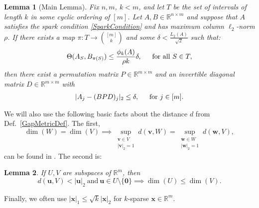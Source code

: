 \documentclass[journal, twocolumn]{IEEEtran}
\newtheorem{lemma}{Lemma}
\begin{document}
\begin{lemma}[Main Lemma]\label{MainLemma}
Fix $n, m$, $k < m$, and let $T$ be the set of intervals of length $k$ in some cyclic ordering of $[m]$. Let $A, B \in \mathbb{R}^{n \times m}$ and suppose that $A$ satisfies the spark condition \eqref{SparkCondition} and has maximum column $\ell_2$-norm $\rho$.  If there exists a map $\pi: T \to {[m] \choose k}$ and some $\delta < \frac{L_{2}(A)}{\sqrt{2}}$ such that: 
\begin{equation}\label{GapUpperBound}
\Theta(A_{S}, B_{\pi(S)}) \leq \frac{ \phi_k(A) }{\rho k} \delta, \indent \text{for all } S \in T,
\end{equation}
%
then there exist a permutation matrix $P \in \mathbb{R}^{m \times m}$ and an invertible diagonal matrix $D \in \mathbb{R}^{m \times m}$ with
\begin{align}\label{MainLemmaBPD}
|A_j - (BPD)_j|_2 \leq \delta, \indent \text{for } j \in [m].
\end{align}
\end{lemma}

We will also use the following basic facts about the distance $d$ from Def.~\ref{GapMetricDef}. The first, 
\begin{equation}\label{SubspaceMetricSameDim}
\dim(W) = \dim(V) \implies \sup_{\substack{\mathbf{v} \in V \\ |\mathbf{v}|_2 = 1}}  d(\mathbf{v},W)  = \sup_{\substack{\mathbf{w} \in W \\ |\mathbf{w}|_2 = 1}} d(\mathbf{w},V),
\end{equation}
can be found in \cite[Lem.~3.3]{Morris10}. The second is:
\begin{lemma}\label{MinDimLemma}
If $U, V$ are subspaces of $\mathbb{R}^{m}$, then
\begin{equation*}
d(\mathbf{u},V) < |\mathbf{u}|_2 \ \text{and} \  \mathbf{u} \in U \setminus{\{\mathbf{0}\}} \implies \dim(U) \leq \dim(V).
\end{equation*}
\end{lemma}
Finally, we often use $|\mathbf{x}|_1 \leq \sqrt{k} |\mathbf{x}|_2$ for $k$-sparse $\mathbf{x} \in \mathbb{R}^m$.
\end{document}
